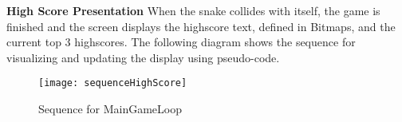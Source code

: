 	\textbf{High Score Presentation} \newline
		When the snake collides with itself, the game is finished and the screen displays the highscore text, defined in Bitmaps, and the current top 3 highscores. The following diagram shows the sequence for visualizing and updating the display using pseudo-code.
		
			\begin{figure}[H]
				\texttt{[image: sequenceHighScore]}
				\centering
				\caption{Sequence for MainGameLoop}
				\label{fig:classMain}
			\end{figure}
		





